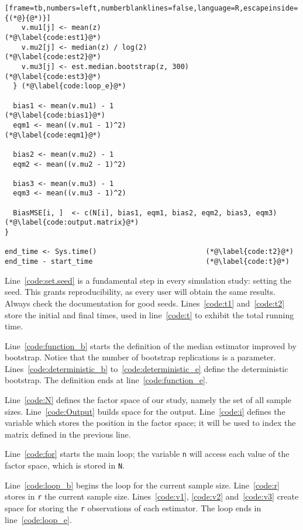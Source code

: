 \begin{lstlisting}[frame=tb,numbers=left,numberblanklines=false,language=R,escapeinside={(*@}{@*)}]
    v.mu1[j] <- mean(z)							(*@\label{code:est1}@*)
    v.mu2[j] <- median(z) / log(2)				(*@\label{code:est2}@*)
    v.mu3[j] <- est.median.bootstrap(z, 300)	(*@\label{code:est3}@*)
  }	(*@\label{code:loop_e}@*)
  
  bias1 <- mean(v.mu1) - 1						(*@\label{code:bias1}@*)
  eqm1 <- mean((v.mu1 - 1)^2)					(*@\label{code:eqm1}@*)
  
  bias2 <- mean(v.mu2) - 1
  eqm2 <- mean((v.mu2 - 1)^2)
  
  bias3 <- mean(v.mu3) - 1
  eqm3 <- mean((v.mu3 - 1)^2)
  
  BiasMSE[i, ]  <- c(N[i], bias1, eqm1, bias2, eqm2, bias3, eqm3)	(*@\label{code:output.matrix}@*)
}

end_time <- Sys.time()							(*@\label{code:t2}@*)
end_time - start_time							(*@\label{code:t}@*)
\end{lstlisting}

Line~\ref{code:set.seed} is a fundamental step in every simulation study: setting the seed.
This grants reproducibility, as every user will obtain the same results.
Always check the documentation for good seeds.
Lines~\ref{code:t1} and~\ref{code:t2} store the initial and final times, used in line~\ref{code:t} to exhibit the total running time.

Line~\ref{code:function_b} starts the definition of the median estimator improved by bootstrap.
Notice that the number of bootstrap replications is a parameter.
Lines~\ref{code:deterministic_b} to~\ref{code:deterministic_e} define the deterministic bootstrap.
The definition ends at line~\ref{code:function_e}.

Line~\ref{code:N} defines the factor space of our study, namely the set of all sample sizes.
Line~\ref{code:Output} builds space for the output.
Line~\ref{code:i} defines the variable which stores the position in the factor space; it will be used to index the matrix defined in the previous line.

Line~\ref{code:for} starts the main loop; the variable \verb|n| will access each value of the factor space, which is stored in \verb|N|.

Line~\ref{code:loop_b} begins the loop for the current sample size.
Line~\ref{code:r} stores in \verb|r| the current sample size.
Lines~\ref{code:v1}, \ref{code:v2} and~\ref{code:v3} create space for storing the \verb|r| observations of each estimator.
The loop ends in line~\ref{code:loop_e}.

